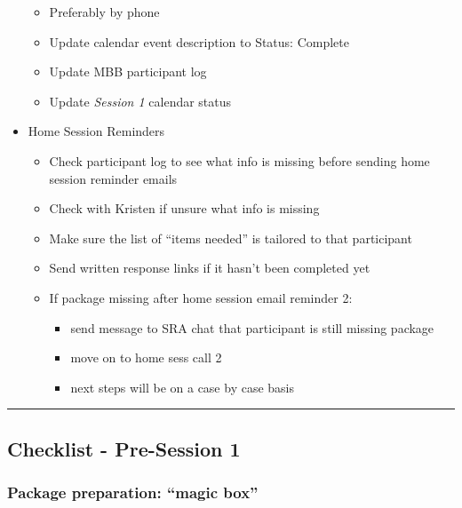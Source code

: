 \documentclass[]{book}
\providecommand{\tightlist}{%
  \setlength{\itemsep}{0pt}\setlength{\parskip}{0pt}}
\begin{document}
\begin{itemize}
  \begin{itemize}
  \tightlist
  \item
    Preferably by phone
  \item
    Update calendar event description to Status: Complete
  \item
    Update MBB participant log
  \item
    Update \emph{Session 1} calendar status
  \end{itemize}
\item
  Home Session Reminders

  \begin{itemize}
  \tightlist
  \item
    Check participant log to see what info is missing before sending home session reminder emails
  \item
    Check with Kristen if unsure what info is missing
  \item
    Make sure the list of ``items needed'' is tailored to that participant
  \item
    Send written response links if it hasn't been completed yet
  \item
    If package missing after home session email reminder 2:

    \begin{itemize}
    \tightlist
    \item
      send message to SRA chat that participant is still missing package
    \item
      move on to home sess call 2
    \item
      next steps will be on a case by case basis
    \end{itemize}
  \end{itemize}
\end{itemize}

\begin{center}\rule{0.5\linewidth}{0.5pt}\end{center}

\hypertarget{checklist---pre-session-1}{%
\subsection{Checklist - Pre-Session 1}\label{checklist---pre-session-1}}

\hypertarget{package-preparation-magic-box}{%
\subsubsection{Package preparation: ``magic box''}\label{package-preparation-magic-box}}
\end{document}
